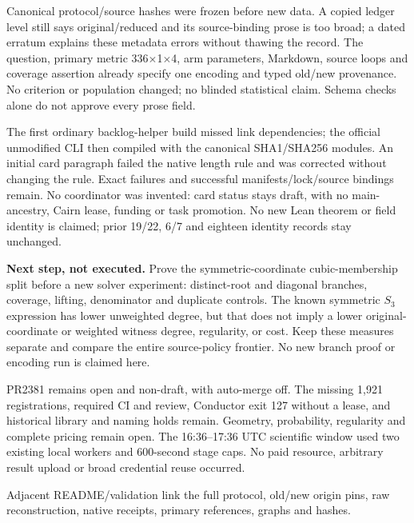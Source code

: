 \documentclass[11pt]{article}
\begin{document}
Canonical protocol/source hashes were frozen before new data. A copied ledger
level still says original/reduced and its source-binding prose is too broad;
a dated erratum explains these metadata errors without thawing the record.
The question, primary metric 336$\times$1$\times$4, arm parameters, Markdown,
source loops and coverage assertion already specify one encoding and typed
old/new provenance. No criterion or population changed; no blinded statistical
claim. Schema checks alone do not approve every prose field.

The first ordinary backlog-helper build missed link dependencies; the official
unmodified CLI then compiled with the canonical SHA1/SHA256 modules. An initial
card paragraph failed the native length rule and was corrected without changing
the rule. Exact failures and successful manifests/lock/source bindings remain.
No coordinator was invented: card status stays draft, with no main-ancestry,
Cairn lease, funding or task promotion. No new Lean theorem or field identity
is claimed; prior 19/22, 6/7 and eighteen identity records stay unchanged.

\textbf{Next step, not executed.} Prove the symmetric-coordinate cubic-membership
split before a new solver experiment: distinct-root and diagonal branches,
coverage, lifting, denominator and duplicate controls. The known symmetric
$S_3$ expression has lower unweighted degree, but that does not imply a lower
original-coordinate or weighted witness degree, regularity, or cost. Keep
these measures separate and compare the entire source-policy frontier. No new
branch proof or encoding run is claimed here.

PR2381 remains open and non-draft, with auto-merge off. The missing 1,921
registrations, required CI and review, Conductor exit 127 without a lease,
and historical library and naming holds remain. Geometry, probability,
regularity and complete pricing remain open. The 16:36--17:36 UTC scientific
window used two existing local workers and 600-second stage caps. No paid
resource, arbitrary result upload or broad credential reuse occurred.

\small Adjacent README/validation link the full protocol, old/new origin pins,
raw reconstruction, native receipts, primary references, graphs and hashes.
\end{document}
